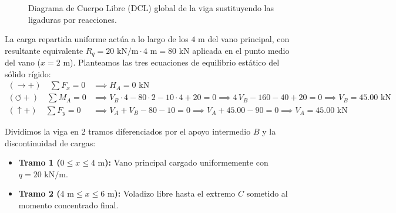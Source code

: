 \begin{figure}[H]
{%
    }
    \caption{Diagrama de Cuerpo Libre (DCL) global de la viga sustituyendo las ligaduras por reacciones.}
    \label{fig:ejemplo10_dcl_global}
\end{figure}


La carga repartida uniforme actúa a lo largo de los $4\text{ m}$ del vano principal, con resultante equivalente $R_q = 20\text{ kN/m} \cdot 4\text{ m} = 80\text{ kN}$ aplicada en el punto medio del vano ($x = 2\text{ m}$). Planteamos las tres ecuaciones de equilibrio estático del sólido rígido:
\begin{align}
    (\rightarrow +) \quad \sum F_x = 0      & \implies \boxed{H_A = 0\text{ kN}}                                                                                                 \\
    (\circlearrowleft +) \quad \sum M_A = 0 & \implies V_B \cdot 4 - 80 \cdot 2 - 10 \cdot 4 + 20 = 0 \implies 4\,V_B - 160 - 40 + 20 = 0 \implies \boxed{V_B = 45.00\text{ kN}} \\
    (\uparrow +) \quad \sum F_y = 0         & \implies V_A + V_B - 80 - 10 = 0 \implies V_A + 45.00 - 90 = 0 \implies \boxed{V_A = 45.00\text{ kN}}
\end{align}


Dividimos la viga en 2 tramos diferenciados por el apoyo intermedio $B$ y la discontinuidad de cargas:
\begin{itemize}
    \item \textbf{Tramo 1 ($0 \le x \le 4\text{ m}$):} Vano principal cargado uniformemente con $q = 20\text{ kN/m}$.
    \item \textbf{Tramo 2 ($4\text{ m} \le x \le 6\text{ m}$):} Voladizo libre hasta el extremo $C$ sometido al momento concentrado final.
\end{itemize}


